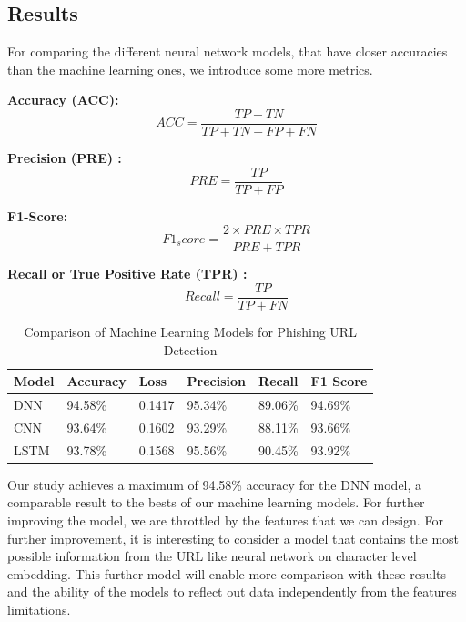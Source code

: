 \documentclass{article}
\begin{document}
    \subsection{Results}\label{subsec:results2}

    For comparing the different neural network models, that have closer accuracies than the machine learning ones, we introduce some more metrics.

    \textbf{Accuracy (ACC):}
    \[
        ACC = \frac{TP + TN}{TP + TN + FP + FN}
    \]

    \textbf{Precision (PRE) :}
    \[
        PRE = \frac{TP}{TP + FP}
    \]

    \textbf{ F1-Score:}
    \[
        F1_score = \frac{2 \times PRE \times TPR}{PRE + TPR}
    \]

    \textbf{Recall or True Positive Rate (TPR)  :}
    \[
        Recall = \frac{TP}{TP + FN}
    \]

    \begin{table}[H]
        \centering
        \begin{tabular}{|l|l|l|l|l|l|}
            \hline
            \textbf{Model} & \textbf{Accuracy} & \textbf{Loss} & \textbf{Precision} & \textbf{Recall} & \textbf{F1 Score} \\ \hline
            DNN            & 94.58\%           & 0.1417        & 95.34\%            & 89.06\%         & 94.69\%           \\ \hline
            CNN            & 93.64\%           & 0.1602        & 93.29\%            & 88.11\%         & 93.66\%           \\ \hline
            LSTM           & 93.78\%           & 0.1568        & 95.56\%            & 90.45\%         & 93.92\%           \\ \hline
        \end{tabular}
        \caption{Comparison of Machine Learning Models for Phishing URL Detection}
        \label{tab:feature_vector_nn_model_comparison}
    \end{table}

    Our study achieves a maximum of 94.58\% accuracy for the DNN model, a comparable result to the bests of our machine learning models.
    For further improving the model, we are throttled by the features that we can design.
    For further improvement, it is interesting to consider a model that contains the most possible information from the URL like neural network on character level embedding.
    This further model will enable more comparison with these results and the ability of the models to reflect out data independently from the features limitations.
\end{document}
